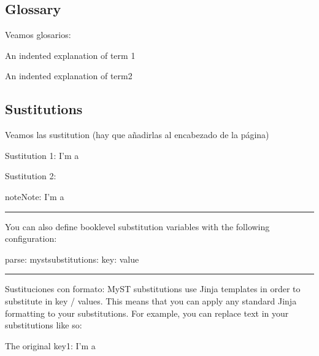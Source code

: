 \documentclass[letterpaper,10pt,english]{jupyterBook}
\begin{document}
\subsection{Glossary}
\label{\detokenize{docs/02_04_Mas_cosas:glossary}}
\sphinxAtStartPar
Veamos glosarios:
\begin{description}
\sphinxAtStartPar
An indented explanation of term 1

\sphinxAtStartPar
An indented explanation of term2

\end{description}


\subsection{Sustitutions}
\label{\detokenize{docs/02_04_Mas_cosas:sustitutions}}
\sphinxAtStartPar
Veamos las sustitution (hay que añadirlas al encabezado de la página)

\sphinxAtStartPar
Sustitution 1: I’m a 

\sphinxAtStartPar
Sustitution 2: 
\begin{sphinxadmonition}{note}{Note:}
\sphinxAtStartPar
I’m a 
\end{sphinxadmonition}



\bigskip\hrule\bigskip


\sphinxAtStartPar
You can also define book\sphinxhyphen{}level substitution variables with the following configuration:

\begin{sphinxVerbatim}[commandchars=\\\{\}]
parse:
  myst\PYGZus{}substitutions:
    key: value
\end{sphinxVerbatim}


\bigskip\hrule\bigskip


\sphinxAtStartPar
Sustituciones con formato: MyST substitutions use Jinja templates in order to substitute in key / values. This means that you can apply any standard Jinja formatting to your substitutions. For example, you can replace text in your substitutions like so:

\sphinxAtStartPar
The original key1: I’m a 
\end{document}
